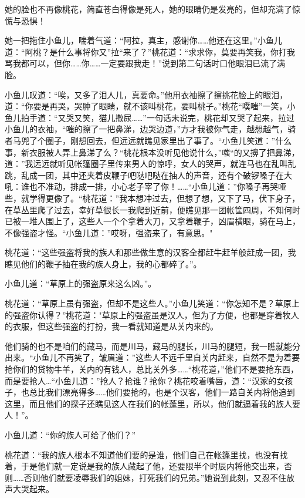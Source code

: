 \documentclass[12pt,oneside]{book}
\begin{document}
她的脸也不再像桃花，简直苍白得像是死人，她的眼睛仍是发亮的，但却充满了惊慌与恐惧！

她一把拖住小鱼儿，喘着气道：``阿拉，真主，感谢你\ldots\ldots 他还在这里。''小鱼儿道：``阿桃？是什么事将你又''拉``来了？''桃花道：``求求你，莫要再笑我，你打我骂我都可以，但你\ldots\ldots 你\ldots\ldots 一定要跟我走！''说到第二句话时口他眼泪已流了满脸。

小鱼儿叹道：``唉，又多了泪人儿，真要命。''他用衣袖擦了擦挑花脸上的眼泪，道：``你要是再哭，哭肿了眼睛，就不该叫桃花，要叫桃子。''桃花``噗嗤''一笑，小鱼儿拍手道：``又哭又笑，猫儿撒尿\ldots\ldots{}''一句话未说完，桃花却又哭了起来，拉过小鱼儿的衣袖，``嗤的擦了一把鼻涕，边哭边道，''方才我被你气走，越想越气，骑者马兜了个圈子，刚想回去，但远远就瞧见家里出了事了。``小鱼儿笑道：''什么事，新衣服被人弄上鼻涕了么？``桃花根本没听见他说什么，''嗤``的又擤了把鼻涕，道：''我远远就听见帐篷圈子里传来男人的惊呼，女人的哭声，就连马也在乱叫乱跳，乱成一团，其中还夹着皮鞭子吧哒吧哒在抽人的声音，还有个破锣嗓子在大吼：谁也不准动，排成一排，小心老子宰了你！\ldots\ldots{}``小鱼儿道：''你嗓子再哭哑些，就学得更像了。``桃花道：''我本想冲过去，但想了想，又下了马，伏下身子，在草丛里爬了过去，幸好草很长一我爬到近前，便瞧见那一团帐筐四周，不知何时已被一堆人围上了，这些人一个个拿着大刀，又拿着鞭子，凶眉横眼，骑在马上，不像强盗才怪。``小鱼儿道：''哎呀，强盗来了，有意思。"

桃花道：``这些强盗将我的族人和那些做生意的汉客全都赶牛赶羊般赶成一团，我瞧见他们的鞭子抽在我的族人身上，我的心都碎了。''。

小鱼儿道：``草原上的强盗原来这么凶。''。

桃花道：``草原上虽有强盗，但却不是这些人。''小鱼儿笑道：``你怎知不是？草原上的强盗你认得？''桃花道："草原上的强盗虽是汉人，但为了方便，也都是穿着牧人的衣服，但这些强盗的打扮，我一看就知道是从关内来的。

他们骑的也不是咱们的藏马，而是川马，藏马的腿长，川马的腿短，我一瞧就能分出来。``小鱼儿不再笑了，皱眉道：''这些人不远千里自关内赶来，自然不是为着要抢你们的贷物牛羊，关内的有钱人，总比关外多\ldots\ldots{}``桃花道，''他们不是要抢东西，而是要抢人\ldots{}``小鱼儿道：''抢人？抢谁？抢你？桃花咬着嘴唇，道：``汉家的女孩子，也总比我们漂亮得多\ldots\ldots 他们要抢的，也是个汉客，他们一路自关内将他追到这里，而且他们的探子还瞧见这人在我们的帐蓬里，所以，他们就逼着我的族人要人！''。

小鱼儿道：``你的族人可给了他们？''

桃花道：``我的族人根本不知道他们要的是谁，他们自己在帐篷里找，也没有找着，于是他们就一定说是我的族人藏起了他，还要限半个时辰内将他交出来，否则\ldots\ldots 否则他们就要凌辱我们的姐妹，打死我们的兄弟。''她说到此刻，又忍不住放声大哭起来。
\end{document}
